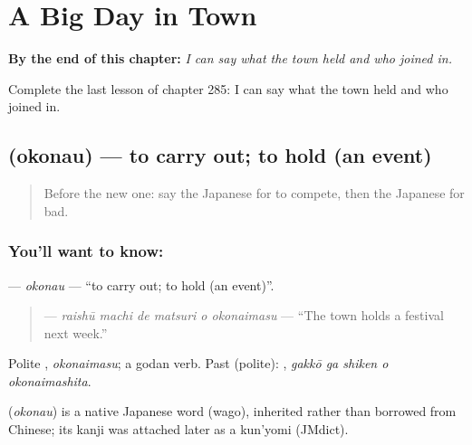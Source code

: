 
\chapter{A Big Day in Town}
\label{ch:ja-a-big-day-in-town}

\begin{chapteropening}
\textbf{By the end of this chapter:} \emph{I can say what the town held and who joined in.}

Complete the last lesson of chapter 285: I can say what the town held and who joined in.
\end{chapteropening}

\section[\texorpdfstring{\ja{おこなう} (okonau)}{おこなう (okonau)}]{ (okonau) — to carry out; to hold (an event)}

\label{lesson:JA-C285-okonau}



\begin{quote}
Before the new one: say the Japanese for to compete, then the Japanese for bad.
\end{quote}

\subsection*{You'll want to know: }
\textbf{} — \emph{okonau} — \textquotedblleft{}to carry out; to hold (an event)\textquotedblright{}.

\begin{quote}
\textbf{   } — \emph{raishū machi de matsuri o okonaimasu} — \textquotedblleft{}The town holds a festival next week.\textquotedblright{}
\end{quote}

Polite \textbf{}, \emph{okonaimasu}; a godan verb. Past (polite): \textbf{  }, \emph{gakkō ga shiken o okonaimashita}.

\begin{cousinweb}
\textbf{} (\emph{okonau}) is a native Japanese word (wago), inherited rather than borrowed from Chinese; its kanji was attached later as a kun'yomi (JMdict).
\end{cousinweb}

